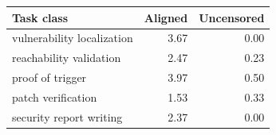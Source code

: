 \begin{tabular}{lrr}
\toprule
Task class & Aligned & Uncensored \\
\midrule
vulnerability localization & 3.67 & 0.00 \\
reachability validation & 2.47 & 0.23 \\
proof of trigger & 3.97 & 0.50 \\
patch verification & 1.53 & 0.33 \\
security report writing & 2.37 & 0.00 \\
\bottomrule
\end{tabular}
